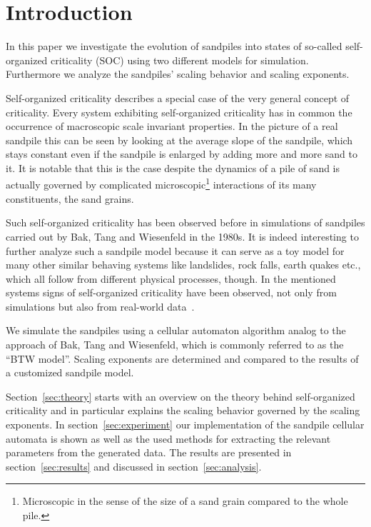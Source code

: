 \begin{abstract}
\dots
\end{abstract}

\maketitle

\section{Introduction}
\label{sec:intro}
In this paper we investigate the evolution of sandpiles into states of so-called self-organized criticality (SOC) using
two different models for simulation. Furthermore we analyze the sandpiles' scaling behavior and scaling exponents.

Self-organized criticality describes a special case of the very general concept of criticality. Every system
exhibiting self-organized criticality has in common the occurrence of macroscopic scale invariant properties.
In the picture of a real sandpile this can be seen by looking at the average slope of the sandpile,
which stays constant even if the sandpile is enlarged by adding more and more sand to it.
It is notable that this is the case despite the dynamics of a pile of sand is actually governed by complicated
microscopic\footnote{Microscopic in the sense of the size of a sand grain compared to the whole pile.} interactions
of its many constituents, the sand grains.

Such self-organized criticality has been observed before in simulations of sandpiles carried out by Bak, Tang and
Wiesenfeld in the 1980s. It is indeed interesting to further analyze such a sandpile model
because it can serve as a toy model for many other similar behaving systems like landslides, rock falls, earth quakes
etc., which all follow from different physical processes, though.
In the mentioned systems signs of self-organized criticality have been observed, not only from simulations but also
from real-world data~\cite{Hergarten}.

We simulate the sandpiles using a cellular automaton algorithm analog to the approach of Bak, Tang and Wiesenfeld,
which is commonly referred to as the \enquote{BTW model}. Scaling exponents are determined and compared to the
results of a customized sandpile model.

Section~\ref{sec:theory} starts with an overview on the theory behind self-organized criticality and in particular
explains the scaling behavior governed by the scaling exponents.
In section~\ref{sec:experiment} our implementation of the sandpile cellular automata is shown as well as
the used methods for extracting the relevant parameters from the generated data.
The results are presented in section~\ref{sec:results} and discussed in section~\ref{sec:analysis}.


